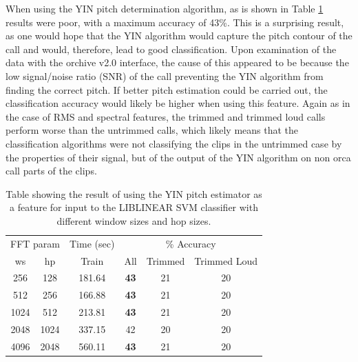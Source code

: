 \documentclass[12pt,oneside]{book}
\begin{document}
When using the YIN pitch determination algorithm, as is shown in Table
\ref{table:calls-different-yin} results were poor, with a maximum
accuracy of 43\%.  This is a surprising result, as one would hope that
the YIN algorithm would capture the pitch contour of the call and
would, therefore, lead to good classification.  Upon examination of
the data with the orchive v2.0 interface, the cause of this appeared
to be because the low signal/noise ratio (SNR) of the call preventing
the YIN algorithm from finding the correct pitch.  If better pitch
estimation could be carried out, the classification accuracy would
likely be higher when using this feature.  Again as in the case of RMS
and spectral features, the trimmed and trimmed loud calls perform
worse than the untrimmed calls, which likely means that the
classification algorithms were not classifying the clips in the
untrimmed case by the properties of their signal, but of the output of
the YIN algorithm on non orca call parts of the clips.

\begin{table}
\begin{tabular}{|c|c|c|c|c|c|}
\hline
\multicolumn{2}{|c|}{FFT param} & \multicolumn{1}{c|}{Time (sec)} & \multicolumn{3}{c|}{\% Accuracy} \\
\hhline{|-|-|-|-|-|-|}
ws & hp & Train & All & Trimmed & Trimmed Loud \\
\hhline{|=|=|=|=|=|=|}
256 & 128      &   181.64  &   \textbf{43} & 21 & 20 \\
512 & 256      &   166.88  &   \textbf{43} & 21 & 20 \\
1024 & 512     &   213.81  &   \textbf{43} & 21 & 20 \\
2048 & 1024    &   337.15  &   42          & 20 & 20 \\
4096 & 2048    &   560.11  &   \textbf{43} & 21 & 20 \\
\hline
\end{tabular}
\caption{Table showing the result of using the YIN pitch estimator as
  a feature for input to the LIBLINEAR SVM classifier with different
  window sizes and hop sizes.}
\label{table:calls-different-yin}
\end{table}
\end{document}
